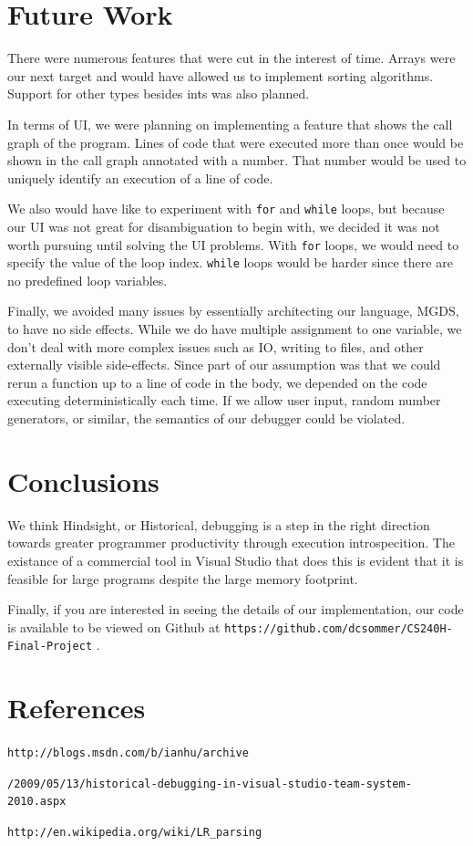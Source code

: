 \documentclass[letterpaper, 10pt]{article}
\newcommand{\ttt}{\texttt}
\begin{document}
\section{Future Work}
There were numerous features that were cut in the interest of time. Arrays
were our next target and would have allowed us to implement sorting
algorithms. Support for other types besides ints was also planned.

In terms of UI, we were planning on implementing a feature that shows the
call graph of the program. Lines of code that were executed more than once
would be shown in the call graph annotated with a number. That number
would be used to uniquely identify an execution of a line of code.

We also would have like to experiment with \ttt{for} and \ttt{while}
loops, but because our UI was not great for disambiguation to begin with,
we decided it was not worth pursuing until solving the UI problems. With
\ttt{for} loops, we would need to specify the value of the loop
index. \ttt{while} loops would be harder since there are no predefined loop
variables. 

Finally, we avoided many issues by essentially architecting our language,
MGDS, to have no side effects. While we do have multiple assignment to one
variable, we don't deal with more complex issues such as IO, writing to
files, and other externally visible side-effects. Since part of our
assumption was that we could rerun a function up to a line of code in the
body, we depended on the code executing deterministically each time. If we
allow user input, random number generators, or similar, the semantics of
our debugger could be violated.

\section{Conclusions}
We think Hindsight, or Historical, debugging is a step in the right
direction towards greater programmer productivity through execution
introspecition.  The existance of a commercial tool in Visual Studio
that does this is evident that it is feasible for large programs
despite the large memory footprint.

Finally, if you are interested in seeing the details of our
implementation, our code is available to be viewed on Github at
\ttt{https://github.com/dcsommer/CS240H-Final-Project} .

\section{References}
\begin{enumerate}[{[}1{]}]

\item
\ttt{http://blogs.msdn.com/b/ianhu/archive}

\ttt{/2009/05/13/historical-debugging-in-visual-studio-team-system-2010.aspx}

\item
\ttt{http://en.wikipedia.org/wiki/LR\_parsing}

\end{enumerate}
\end{document}
